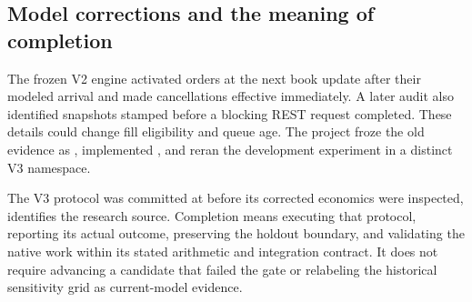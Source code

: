 \subsection{Model corrections and the meaning of completion}

The frozen V2 engine activated orders at the next book update after their
modeled arrival and made cancellations effective immediately. A later audit
also identified snapshots stamped before a blocking REST request completed.
These details could change fill eligibility and queue age. The project froze
the old evidence as \LegacyModel, implemented \CurrentModel, and reran the
development experiment in a distinct V3 namespace.

The V3 protocol was committed at \ProtocolCommit{} before its corrected
economics were inspected, \ResearchCommit{} identifies the research source.
Completion means executing that protocol, reporting its actual outcome,
preserving the holdout boundary, and validating the native work within its
stated arithmetic and integration contract. It does not require advancing a
candidate that failed the gate or relabeling the historical sensitivity grid
as current-model evidence.
